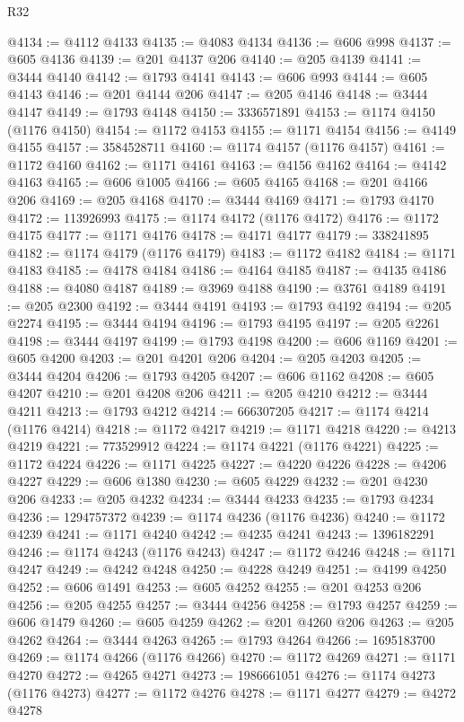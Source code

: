 \begin{lexlean}{R32}
\begin{coremodule}
@4134 := @4112 @4133
@4135 := @4083 @4134
@4136 := @606 @998
@4137 := @605 @4136
@4139 := @201 @4137 @206
@4140 := @205 @4139
@4141 := @3444 @4140
@4142 := @1793 @4141
@4143 := @606 @993
@4144 := @605 @4143
@4146 := @201 @4144 @206
@4147 := @205 @4146
@4148 := @3444 @4147
@4149 := @1793 @4148
@4150 := 3336571891
@4153 := @1174 @4150 (@1176 @4150)
@4154 := @1172 @4153
@4155 := @1171 @4154
@4156 := @4149 @4155
@4157 := 3584528711
@4160 := @1174 @4157 (@1176 @4157)
@4161 := @1172 @4160
@4162 := @1171 @4161
@4163 := @4156 @4162
@4164 := @4142 @4163
@4165 := @606 @1005
@4166 := @605 @4165
@4168 := @201 @4166 @206
@4169 := @205 @4168
@4170 := @3444 @4169
@4171 := @1793 @4170
@4172 := 113926993
@4175 := @1174 @4172 (@1176 @4172)
@4176 := @1172 @4175
@4177 := @1171 @4176
@4178 := @4171 @4177
@4179 := 338241895
@4182 := @1174 @4179 (@1176 @4179)
@4183 := @1172 @4182
@4184 := @1171 @4183
@4185 := @4178 @4184
@4186 := @4164 @4185
@4187 := @4135 @4186
@4188 := @4080 @4187
@4189 := @3969 @4188
@4190 := @3761 @4189
@4191 := @205 @2300
@4192 := @3444 @4191
@4193 := @1793 @4192
@4194 := @205 @2274
@4195 := @3444 @4194
@4196 := @1793 @4195
@4197 := @205 @2261
@4198 := @3444 @4197
@4199 := @1793 @4198
@4200 := @606 @1169
@4201 := @605 @4200
@4203 := @201 @4201 @206
@4204 := @205 @4203
@4205 := @3444 @4204
@4206 := @1793 @4205
@4207 := @606 @1162
@4208 := @605 @4207
@4210 := @201 @4208 @206
@4211 := @205 @4210
@4212 := @3444 @4211
@4213 := @1793 @4212
@4214 := 666307205
@4217 := @1174 @4214 (@1176 @4214)
@4218 := @1172 @4217
@4219 := @1171 @4218
@4220 := @4213 @4219
@4221 := 773529912
@4224 := @1174 @4221 (@1176 @4221)
@4225 := @1172 @4224
@4226 := @1171 @4225
@4227 := @4220 @4226
@4228 := @4206 @4227
@4229 := @606 @1380
@4230 := @605 @4229
@4232 := @201 @4230 @206
@4233 := @205 @4232
@4234 := @3444 @4233
@4235 := @1793 @4234
@4236 := 1294757372
@4239 := @1174 @4236 (@1176 @4236)
@4240 := @1172 @4239
@4241 := @1171 @4240
@4242 := @4235 @4241
@4243 := 1396182291
@4246 := @1174 @4243 (@1176 @4243)
@4247 := @1172 @4246
@4248 := @1171 @4247
@4249 := @4242 @4248
@4250 := @4228 @4249
@4251 := @4199 @4250
@4252 := @606 @1491
@4253 := @605 @4252
@4255 := @201 @4253 @206
@4256 := @205 @4255
@4257 := @3444 @4256
@4258 := @1793 @4257
@4259 := @606 @1479
@4260 := @605 @4259
@4262 := @201 @4260 @206
@4263 := @205 @4262
@4264 := @3444 @4263
@4265 := @1793 @4264
@4266 := 1695183700
@4269 := @1174 @4266 (@1176 @4266)
@4270 := @1172 @4269
@4271 := @1171 @4270
@4272 := @4265 @4271
@4273 := 1986661051
@4276 := @1174 @4273 (@1176 @4273)
@4277 := @1172 @4276
@4278 := @1171 @4277
@4279 := @4272 @4278

\end{coremodule}
\end{lexlean}
